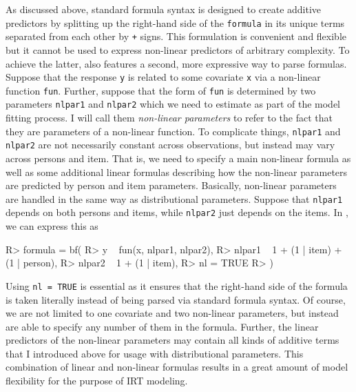\documentclass[
]{jss}
\begin{document}
As discussed above, standard  formula syntax is designed to
create additive predictors by splitting up the right-hand side of the
\texttt{formula} in its unique terms separated from each other by
\texttt{+} signs. This formulation is convenient and flexible but it
cannot be used to express non-linear predictors of arbitrary complexity.
To achieve the latter,  also features a second, more
expressive way to parse  formulas. Suppose that the response
\texttt{y} is related to some covariate \texttt{x} via a non-linear
function \texttt{fun}. Further, suppose that the form of \texttt{fun} is
determined by two parameters \texttt{nlpar1} and \texttt{nlpar2} which
we need to estimate as part of the model fitting process. I will call
them \emph{non-linear parameters} to refer to the fact that they are
parameters of a non-linear function. To complicate things,
\texttt{nlpar1} and \texttt{nlpar2} are not necessarily constant across
observations, but instead may vary across persons and item. That is, we
need to specify a main non-linear formula as well as some additional
linear formulas describing how the non-linear parameters are predicted
by person and item parameters. Basically, non-linear parameters are
handled in the same way as distributional parameters. Suppose that
\texttt{nlpar1} depends on both persons and items, while \texttt{nlpar2}
just depends on the items. In , we can express this as

\begin{CodeChunk}

\begin{CodeInput}
R> formula = bf(
R>   y ~ fun(x, nlpar1, nlpar2),
R>   nlpar1 ~ 1 + (1 | item) + (1 | person),
R>   nlpar2 ~ 1 + (1 | item),
R>   nl = TRUE
R> )
\end{CodeInput}
\end{CodeChunk}

Using \texttt{nl\ =\ TRUE} is essential as it ensures that the
right-hand side of the formula is taken literally instead of being
parsed via standard  formula syntax. Of course, we are not
limited to one covariate and two non-linear parameters, but instead are
able to specify any number of them in the formula. Further, the linear
predictors of the non-linear parameters may contain all kinds of
additive terms that I introduced above for usage with distributional
parameters. This combination of linear and non-linear formulas results
in a great amount of model flexibility for the purpose of IRT modeling.
\end{document}
